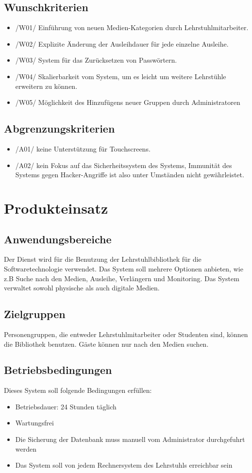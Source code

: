 \documentclass[12pt, a4paper]{article}
\begin{document}
\subsection{Wunschkriterien}
\begin{itemize}
	\item /W01/ Einführung von neuen Medien-Kategorien durch Lehrstuhlmitarbeiter.
	\item /W02/ Explizite Änderung der Ausleihdauer für jede einzelne Ausleihe.
	\item /W03/ System für das Zurücksetzen von Passwörtern.
	\item /W04/ Skalierbarkeit vom System, um es leicht um weitere Lehrstühle erweitern zu können.
	\item /W05/ Möglichkeit des Hinzufügens neuer Gruppen durch Administratoren
\end{itemize}
\subsection{Abgrenzungskriterien}
\begin{itemize}
	\item /A01/ keine Unterstützung für Touchscreens.
	\item /A02/ kein Fokus auf das Sicherheitssystem des Systems,  Immunität des Systems gegen Hacker-Angriffe ist also unter Umständen nicht gewährleistet.
\end{itemize}
\pagebreak

\section{Produkteinsatz}
\subsection{Anwendungsbereiche}
Der Dienst wird für die Benutzung der Lehrstuhlbibliothek für die Softwaretechnologie verwendet.  Das System soll mehrere Optionen anbieten, wie z.B Suche nach den Medien, Ausleihe, Verlängern und Monitoring. Das System verwaltet sowohl physische als auch digitale Medien.
\subsection{Zielgruppen}
Personengruppen, die entweder Lehrstuhlmitarbeiter oder Studenten sind, können die Bibliothek benutzen. Gäste können nur nach den Medien suchen.
\subsection{Betriebsbedingungen}
Dieses System soll folgende Bedingungen erfüllen:
\begin{itemize}
\item Betriebsdauer: 24 Stunden täglich
\item Wartungsfrei
\item Die Sicherung der Datenbank muss manuell vom Administrator durchgefuhrt werden
\item Das System soll von jedem Rechnersystem des Lehrstuhls erreichbar sein
\end{itemize}
\pagebreak
\end{document}
